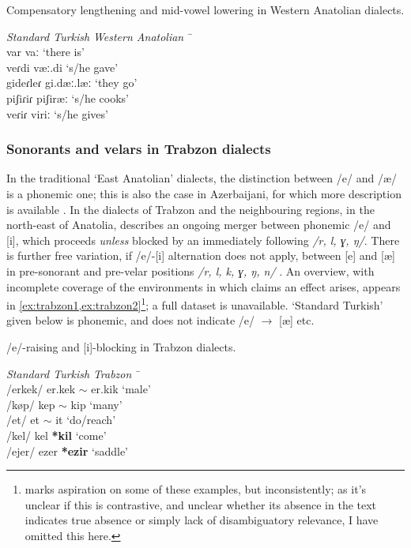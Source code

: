 \begin{example}\label{ex:anatolian} Compensatory lengthening and mid-vowel lowering in Western Anatolian dialects. \citep[p.~241]{Sezer1986}
\begin{tabbing}
  \textit{Standard Turkish} \tab[2cm] \= \textit{Western Anatolian} \tab[2cm] \= \ \\
  var \tab[2cm] \> vaː \tab[2cm] \> `there is'\\
  veɾdi  \> væː.di \> `s/he gave'\\
  gideɾleɾ \> gi.dæː.læː \> `they go' \\
  piʃiɾiɾ \> piʃiræː \> `s/he cooks' \\
  veɾiɾ \> viriː \> `s/he gives'
\end{tabbing}
\end{example}

\subsubsection{Sonorants and velars in Trabzon dialects}\label{tr_trabzon}

In the traditional `East Anatolian' dialects, the distinction between /e/ and /æ/ is a phonemic one; this is also the case in Azerbaijani, for which more description is available \citep{Dehghani2000,Schoenig1998Azer}.  In the dialects of Trabzon and the neighbouring regions, in the north-east of Anatolia, \cite[p.~53]{Brendemoen2002} describes an ongoing merger between phonemic /e/ and [i], which proceeds \emph{unless} blocked by an immediately following \emph{/r, l, ɣ, ŋ/}. There is further free variation, if /e/-[i] alternation does not apply, between [e] and [æ] in pre-sonorant and pre-velar positions \emph{/r, l, k, ɣ, ŋ, n/} \citep[p.~55]{Brendemoen2002}. An overview, with incomplete coverage of the environments in which \citeauthor{Brendemoen2002} claims an effect arises, appears in \cref{ex:trabzon1,ex:trabzon2}\footnote{\citet{Brendemoen2002} marks aspiration on some of these examples, but inconsistently; as it's unclear if this is contrastive, and unclear whether its absence in the text indicates true absence or simply lack of disambiguatory relevance, I have omitted this here.}; a full dataset is unavailable. `Standard Turkish' given below is phonemic, and does not indicate /e/ $\rightarrow$ [æ] etc.

\begin{example}\label{ex:trabzon1} /e/-raising and [i]-blocking in Trabzon dialects.
\begin{tabbing}
  \textit{Standard Turkish} \tab[2cm] \= \textit{Trabzon} \tab[2cm] \= \ \\
  /erkek/ \> er.kek $\sim$ er.kik \> `male'\\
  /køp/\footnotemark  \> kep $\sim$ kip \> `many'\\
  /et/ \> et $\sim$ it \> `do/reach' \\
  /kel/ \> kel \textbf{*kil} \> `come' \\
  /ejer/ \> ezer \textbf{*ezir} \> `saddle'
\end{tabbing}
\end{example}

